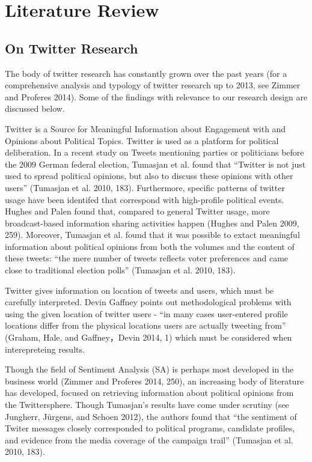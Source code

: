 \documentclass[]{article}
\begin{document}
\section{Literature Review}\label{literature-review}

\subsection{On Twitter Research}\label{on-twitter-research}

The body of twitter research has constantly grown over the past years
(for a comprehensive analysis and typology of twitter research up to
2013, see Zimmer and Proferes 2014). Some of the findings with relevance
to our research design are discussed below.

Twitter is a Source for Meaningful Information about Engagement with and
Opinions about Political Topics. Twitter is used as a platform for
political deliberation. In a recent study on Tweets mentioning parties
or politicians before the 2009 German federal election, Tumasjan et al.
found that ``Twitter is not just used to spread political opinions, but
also to discuss these opinions with other users'' (Tumasjan et al. 2010,
183). Furthermore, specific patterns of twitter usage have been
identifed that correspond with high-profile political events. Hughes and
Palen found that, compared to general Twitter usage, more
broadcast-based information sharing activities happen (Hughes and Palen
2009, 259). Moreover, Tumasjan et al. found that it was possible to
extact meaningful information about political opinions from both the
volumes and the content of these tweets: ``the mere number of tweets
reflects voter preferences and came close to traditional election
polls'' (Tumasjan et al. 2010, 183).

Twitter gives information on location of tweets and users, which must be
carefully interpreted. Devin Gaffney points out methodological problems
with using the given location of twitter users - ``in many cases
user-entered profile locations differ from the physical locations users
are actually tweeting from'' (Graham, Hale, and Gaffney，Devin 2014, 1)
which must be considered when interepreteing results.

Though the field of Sentiment Analysis (SA) is perhaps most developed in
the business world (Zimmer and Proferes 2014, 250), an increasing body
of literature has developed, focused on retrieving information about
political opinions from the Twittersphere. Though Tumasjan's results
have come under scrutiny (see Jungherr, J{ü}rgens, and Schoen 2012), the
authors found that ``the sentiment of Twiter messages closely
corresponded to political programs, candidate profiles, and evidence
from the media coverage of the campaign trail'' (Tumasjan et al. 2010,
183).
\end{document}
